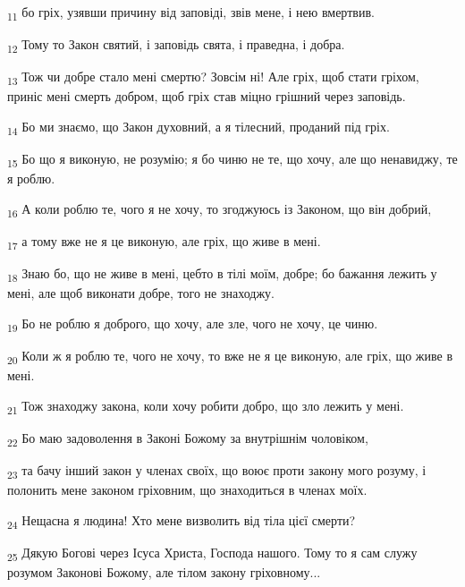 \begin{tcolorbox}
\textsubscript{11} бо гріх, узявши причину від заповіді, звів мене, і нею вмертвив.
\end{tcolorbox}
\begin{tcolorbox}
\textsubscript{12} Тому то Закон святий, і заповідь свята, і праведна, і добра.
\end{tcolorbox}
\begin{tcolorbox}
\textsubscript{13} Тож чи добре стало мені смертю? Зовсім ні! Але гріх, щоб стати гріхом, приніс мені смерть добром, щоб гріх став міцно грішний через заповідь.
\end{tcolorbox}
\begin{tcolorbox}
\textsubscript{14} Бо ми знаємо, що Закон духовний, а я тілесний, проданий під гріх.
\end{tcolorbox}
\begin{tcolorbox}
\textsubscript{15} Бо що я виконую, не розумію; я бо чиню не те, що хочу, але що ненавиджу, те я роблю.
\end{tcolorbox}
\begin{tcolorbox}
\textsubscript{16} А коли роблю те, чого я не хочу, то згоджуюсь із Законом, що він добрий,
\end{tcolorbox}
\begin{tcolorbox}
\textsubscript{17} а тому вже не я це виконую, але гріх, що живе в мені.
\end{tcolorbox}
\begin{tcolorbox}
\textsubscript{18} Знаю бо, що не живе в мені, цебто в тілі моїм, добре; бо бажання лежить у мені, але щоб виконати добре, того не знаходжу.
\end{tcolorbox}
\begin{tcolorbox}
\textsubscript{19} Бо не роблю я доброго, що хочу, але зле, чого не хочу, це чиню.
\end{tcolorbox}
\begin{tcolorbox}
\textsubscript{20} Коли ж я роблю те, чого не хочу, то вже не я це виконую, але гріх, що живе в мені.
\end{tcolorbox}
\begin{tcolorbox}
\textsubscript{21} Тож знаходжу закона, коли хочу робити добро, що зло лежить у мені.
\end{tcolorbox}
\begin{tcolorbox}
\textsubscript{22} Бо маю задоволення в Законі Божому за внутрішнім чоловіком,
\end{tcolorbox}
\begin{tcolorbox}
\textsubscript{23} та бачу інший закон у членах своїх, що воює проти закону мого розуму, і полонить мене законом гріховним, що знаходиться в членах моїх.
\end{tcolorbox}
\begin{tcolorbox}
\textsubscript{24} Нещасна я людина! Хто мене визволить від тіла цієї смерти?
\end{tcolorbox}
\begin{tcolorbox}
\textsubscript{25} Дякую Богові через Ісуса Христа, Господа нашого. Тому то я сам служу розумом Законові Божому, але тілом закону гріховному...
\end{tcolorbox}
